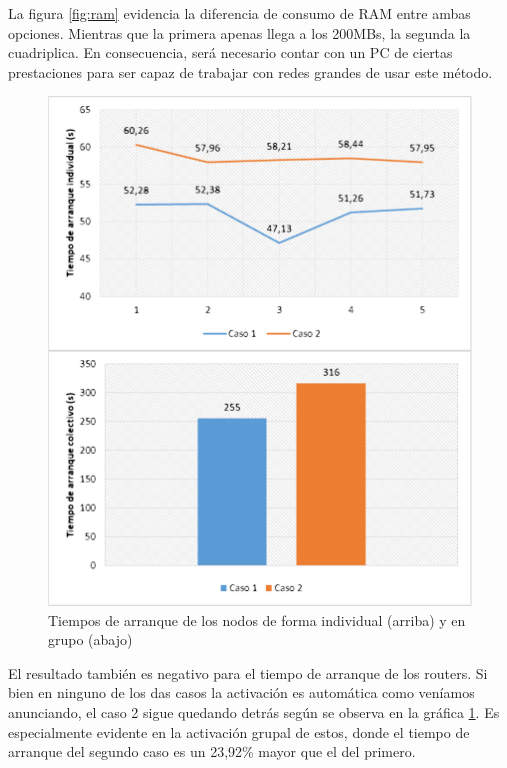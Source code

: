 La figura \ref{fig:ram} evidencia la diferencia de consumo de RAM entre ambas opciones. Mientras que la primera apenas llega a los 200MBs, la segunda la cuadriplica. En consecuencia, será necesario contar con un PC de ciertas prestaciones para ser capaz de trabajar con redes grandes de usar este método.

\begin{figure}[H]
  \centering
  \includegraphics[scale=0.4]{imagenes/tiemposarranque}
  \caption{Tiempos de arranque de los nodos de forma individual (arriba) y en grupo (abajo)}
  \label{fig:tiemposarranque}
\end{figure}

El resultado también es negativo para el tiempo de arranque de los routers. Si bien en ninguno de los das casos la activación es automática como veníamos anunciando, el caso 2 sigue quedando detrás según se observa en la gráfica \ref{fig:tiemposarranque}. Es especialmente evidente en la activación grupal de estos, donde el tiempo de arranque del segundo caso es un 23,92\% mayor que el del primero.

